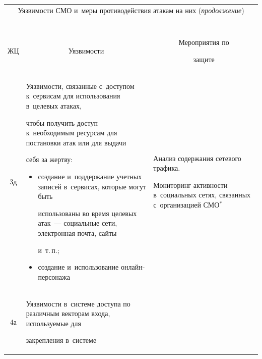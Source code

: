 \begin{table}\small  %

\label{s2}

\begin{center}

\tabcolsep=3pt

\begin{tabular}{|c|p{64mm}|p{52mm}|}

\multicolumn{3}{c}{Уязвимости СМО и~меры противодействия атакам на них (\textit{продолжение})}\\

\multicolumn{3}{c}{\ }\\[-6pt]

\hline

ЖЦ&\multicolumn{1}{c|}{Уязвимости}&\multicolumn{1}{c|}{Мероприятия по 

защите}\\

\hline

3д&Уязвимости, связанные с~доступом к~сервисам для использования в~целевых атаках, 

чтобы получить доступ к~необходимым ресурсам для постановки атак или для выдачи 

себя за жертву:\vspace*{-6pt}

\begin{itemize}

\addtolength{\itemsep}{-6pt}

\item создание и~поддержание учетных записей в~сервисах, которые могут быть 

использованы во время целевых атак~--- социальные сети, электронная почта, сайты 

и~т.\,п.;

\item создание и~использование он\-лайн-пер\-со\-нажа\vspace*{-6pt}

\end{itemize}&Анализ содержания сетевого трафика.\newline

Мониторинг активности в~социальных сетях, связанных с~организацией СМО$^{*}$\\

\hline

4а&Уязвимости в~системе доступа по различным векторам входа, используемые для 

закрепления в~системе\vspace*{-6pt}


\end{tabular}
\end{center}
\end{table}
